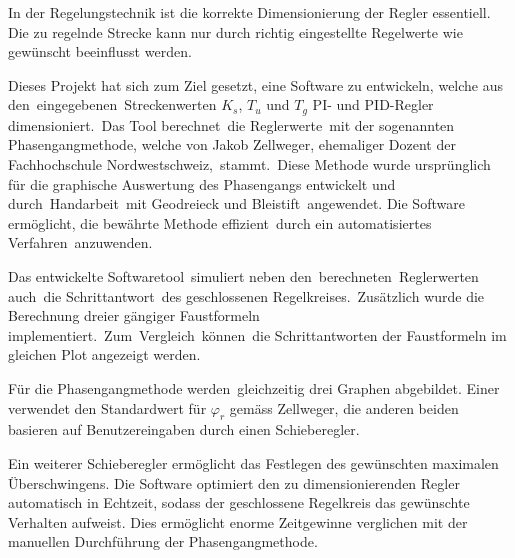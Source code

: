 In  der   Regelungstechnik  ist   die  korrekte  Dimensionierung   der  Regler
essentiell. Die  zu  regelnde  Strecke  kann nur  durch  richtig  eingestellte
Regelwerte wie gew\"unscht beeinflusst werden. 
 

Dieses  Projekt  hat sich  zum  Ziel  gesetzt,  eine Software  zu  entwickeln,
welche  aus   den eingegebenen Streckenwerten  $K_s$,  $T_u$  und   $T_g$  PI-
und  PID-Regler  dimensioniert. Das  Tool  berechnet die  Reglerwerte mit  der
sogenannten   Phasengangmethode,  welche   von  Jakob   Zellweger,  ehemaliger
Dozent   der  Fachhochschule   Nordwestschweiz, stammt. Diese  Methode   wurde
urspr\"unglich  f\"ur die  graphische  Auswertung  des Phasengangs  entwickelt
und  durch Handarbeit mit  Geodreieck und  Bleistift angewendet. Die  Software
erm\"oglicht,  die  bew\"ahrte  Methode  effizient durch  ein  automatisiertes
Verfahren anzuwenden.
 

Das  entwickelte   Softwaretool simuliert  neben  den berechneten Reglerwerten
auch die    Schrittantwort des     geschlossenen    Regelkreises. Zus\"atzlich
wurde      die       Berechnung      dreier       g\"angiger      Faustformeln
implementiert. Zum Vergleich k\"onnen die Schrittantworten der Faustformeln im
gleichen Plot angezeigt werden.


F\"ur die Phasengangmethode werden gleichzeitig drei Graphen abgebildet. Einer
verwendet den  Standardwert f\"ur $\varphi_r$ gem\"ass  Zellweger, die anderen
beiden basieren auf Benutzereingaben durch einen Schieberegler.


Ein  weiterer  Schieberegler  erm\"oglicht  das  Festlegen  des  gew\"unschten
maximalen  \"Uberschwingens. Die Software  optimiert den  zu dimensionierenden
Regler  automatisch  in  Echtzeit,  sodass  der  geschlossene  Regelkreis  das
gew\"unschte   Verhalten   aufweist. Dies  erm\"oglicht   enorme   Zeitgewinne
verglichen mit der manuellen Durchf\"uhrung der Phasengangmethode.
